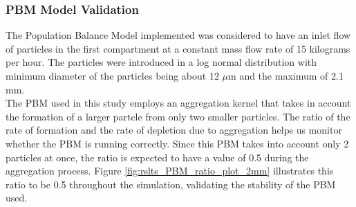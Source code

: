 \documentclass[preprint,11pt,authoryear]{elsarticle}
\begin{document}
\subsubsection{PBM Model Validation}
The Population Balance Model implemented was considered to have an inlet flow of particles in the first compartment at a constant mass flow rate of 15 kilograms per hour. The particles were introduced in a log normal distribution with minimum diameter of the particles being about 12 $\mu$m and the maximum of 2.1 mm. \\
The PBM used in this study employs an aggregation kernel that takes in account the formation of a larger partcle from only two smaller particles. The ratio of the rate of formation and the rate of depletion due to aggregation helps us monitor whether the PBM is running correctly. Since this PBM takes into account only 2 particles at once, the ratio is expected to have a value of 0.5 during the aggregation process. Figure \ref{fig:rslts_PBM_ratio_plot_2mm} illustrates this ratio to be 0.5 throughout the simulation, validating the stability of the PBM used.\\
\end{document}
